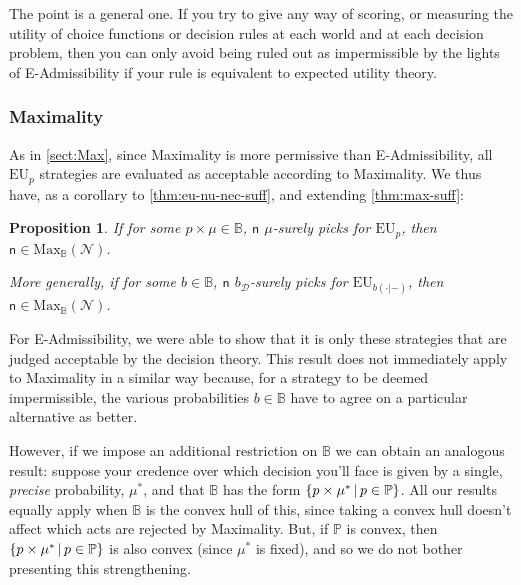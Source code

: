 \documentclass[a4paper]{article}
\newtheorem{proposition}[theorem]{Proposition}
\renewcommand\P{\mathbb{P}} %
\newcommand\EU{\mathrm{EU}}
\newcommand\Maximality{\mathrm{Max}}
\newcommand{\Decs}{\mathcal{D}}
\newcommand{\n}{\mathsf{n}}
\newcommand\Nu{\mathcal{N}}
\newcommand{\IB}{\mathbb{B}}
\newcommand{\IP}{\P}
\newcommand{\todoold}[2][]{\todo[backgroundcolor=white,bordercolor=orange!10,linecolor=gray!10, #1,caption={},textcolor=gray]{Pre-rev: #2}}
\newcommand{\todooldinfo}[2][]{\todoold[#1]{#2}}
\newcommand\SetDelimiter[1][]{
	\nonscript\,#1\vert \allowbreak \nonscript\,\mathopen{}}
\providecommand\given{\SetDelimiter}
\newenvironment{CCM rewritten}
{\begingroup\color{blue}} %
{\endgroup}              %
\begin{document}
	The point is a general one.  If you try to give any way of scoring, or measuring the utility of choice functions or decision rules at each world and at each decision problem, then you can only avoid being ruled out as impermissible by the lights of E-Admissibility if your rule is equivalent to expected utility theory. 


\subsubsection{Maximality}\label{sect:nu:Max}


As in \cref{sect:Max}, since Maximality is more permissive than E-Admissibility, all $\EU_p$ strategies are evaluated as acceptable according to Maximality. We thus have, as a corollary to \cref{thm:eu-nu-nec-suff}, and extending \cref{thm:max-suff}:
\begin{proposition}\label{thm:max-nu-suff}
		If for some $p\times\mu\in \IB$, $\n$ $\mu$-surely picks for $\EU_{p}$, then $\n\in\Maximality_\IB(\Nu)$. 
		
		More generally, if for some $b\in \IB$, $\n$ $b_\Decs$-surely picks for $\EU_{b(\cdot|-)}$, then $\n\in\Maximality_\IB(\Nu)$. 
\end{proposition}

For E-Admissibility, we were able to show that it is only these strategies that are judged acceptable by the decision theory. This result does not immediately apply to Maximality in a similar way because, for a strategy to be deemed impermissible, the various probabilities $b\in \IB$ have to agree on a particular alternative as better.

However, if we impose an additional restriction on $\IB$ we can obtain an analogous result: suppose your credence over which decision you'll face is given by a single, \emph{precise} probability, $\mu^*$, and that $\IB$ has the form $\{p\times \mu^*\given p\in \IP\}$. All our results equally apply when $\IB$ is the convex hull of this, since taking a convex hull doesn't affect which acts are rejected by Maximality. But, if $\IP$ is convex, then $\{p\times\mu^*\given p\in\IP\}$ is also convex (since $\mu^*$ is fixed), and so we do not bother presenting this strengthening. 
\todoold{check!!!}
\end{document}
